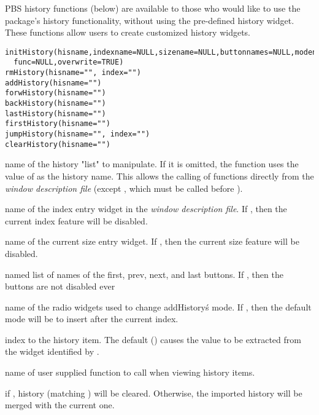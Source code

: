 \documentclass[letterpaper]{book}
\begin{document}
\begin{Description}\relax
PBS history functions (below) are available to those who would like to 
use the package's history functionality, without using the pre-defined history widget. 
These functions allow users to create customized history widgets.
\end{Description}
\begin{Usage}
\begin{verbatim}
initHistory(hisname,indexname=NULL,sizename=NULL,buttonnames=NULL,modename=NULL,
  func=NULL,overwrite=TRUE)
rmHistory(hisname="", index="")
addHistory(hisname="")
forwHistory(hisname="")
backHistory(hisname="")
lastHistory(hisname="")
firstHistory(hisname="")
jumpHistory(hisname="", index="")
clearHistory(hisname="")
\end{verbatim}
\end{Usage}
\begin{Arguments}
\begin{ldescription}
\item[\code{hisname}] name of the history "list" to manipulate. If it is omitted, 
the function uses the value of  as the history name. 
This allows the calling of functions directly from the \emph{window description file} 
(except , which must be called before ).
\item[\code{indexname}] name of the index entry widget in the \emph{window description file}. 
If , then the current index feature will be disabled.
\item[\code{sizename}] name of the current size entry widget. If , then the 
current size feature will be disabled.
\item[\code{buttonnames}] named list of names of the first, prev, next, and last buttons. If , then the 
buttons are not disabled ever
\item[\code{modename}] name of the radio widgets used to change addHistory\'s mode. If , then the 
default mode will be to insert after the current index.
\item[\code{index}] index to the history item. The default () causes the value to be 
extracted from the widget identified by .
\item[\code{func}] name of user supplied function to call when viewing history items.
\item[\code{overwrite}] if , history (matching ) will be cleared. 
Otherwise, the imported history will be merged with the current one.
\end{ldescription}
\end{Arguments}
\end{document}
